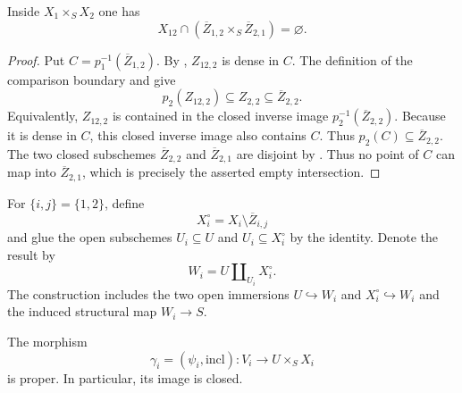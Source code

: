 \begin{lemma}
  \label{lemma:nagata-key-boundary-disjointness}
  \leanok

  Inside $X_1\times_SX_2$ one has
  \[
    X_{12}\cap
    (\overline Z_{1,2}\times_S\overline Z_{2,1})
    =\varnothing.
  \]
\end{lemma}

\begin{proof}
  \leanok
  Put $C=p_1^{-1}(\overline Z_{1,2})$.  By
  , $Z_{12,2}$ is dense in
  $C$.  The definition of the comparison boundary and
   give
  \[
    p_2(Z_{12,2})\subseteq Z_{2,2}\subseteq\overline Z_{2,2}.
  \]
  Equivalently, $Z_{12,2}$ is contained in the closed inverse image
  $p_2^{-1}(\overline Z_{2,2})$.  Because it is dense in $C$, this closed
  inverse image also contains $C$.  Thus
  $p_2(C)\subseteq\overline Z_{2,2}$.
  The two closed subschemes $\overline Z_{2,2}$ and
  $\overline Z_{2,1}$ are disjoint by
  .  Thus no point of $C$ can map into
  $\overline Z_{2,1}$, which is precisely the asserted empty intersection.
\end{proof}

\begin{definition}
  \label{def:nagata-two-open-intermediate-schemes}
  \leanok

  For $\{i,j\}=\{1,2\}$, define
  \[
    X_i^\circ=X_i\setminus\overline Z_{i,j}
  \]
  and glue the open subschemes $U_i\subseteq U$ and
  $U_i\subseteq X_i^\circ$ by the identity.  Denote the result by
  \[
    W_i=U\amalg_{U_i}X_i^\circ.
  \]
  The construction includes the two open immersions
  $U\hookrightarrow W_i$ and $X_i^\circ\hookrightarrow W_i$ and the induced
  structural map $W_i\to S$.
\end{definition}


\begin{lemma}
  \label{lemma:nagata-proper-extension-graph-closed}
  \leanok

  The morphism
  \[
    \gamma_i=(\psi_i,\mathrm{incl})\colon
    V_i\longrightarrow U\times_SX_i
  \]
  is proper.  In particular, its image is closed.
\end{lemma}

